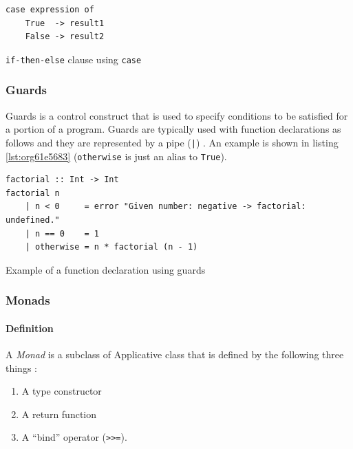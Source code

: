 \documentclass[a4paper, titlepage, twoside]{article}
\begin{document}
\begin{listing}[htbp]
\begin{verbatim}
case expression of
    True  -> result1
    False -> result2
\end{verbatim}
\caption{\label{lst:orgcc246f8}\texttt{if-then-else} clause using \texttt{case}}
\end{listing}

\subsubsection{Guards}
\label{sec:org9bd9b01}

Guards is a control construct that is used to specify conditions to be satisfied for a portion of a program. Guards are typically used with function declarations as follows and they are represented by a pipe (\texttt{|}) \autocite{kremerCPSC449Programming2015}. An example is shown in listing \ref{lst:org61e5683} (\texttt{otherwise} is just an alias to \texttt{True}).

\begin{listing}[htbp]
\begin{verbatim}
factorial :: Int -> Int
factorial n
    | n < 0     = error "Given number: negative -> factorial: undefined."
    | n == 0    = 1
    | otherwise = n * factorial (n - 1)
\end{verbatim}
\caption{\label{lst:org61e5683}Example of a function declaration using guards}
\end{listing}

\subsubsection{Monads}
\label{sec:org848fc74}

\paragraph*{Definition}
\label{sec:orgdc7adc3}

A \emph{Monad} is a subclass of Applicative class that is defined by the following three things \autocite{wikibooksHaskellUnderstandingMonads2021}:

\begin{enumerate}
\item A type constructor
\item A return function
\item A ``bind'' operator (\texttt{>{}>{}=}).
\end{enumerate}
\end{document}
